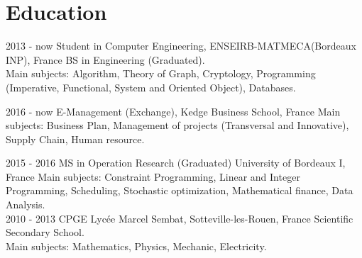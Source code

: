 \documentclass[]{friggeri-cv}
\begin{document}
\section{Education}
\begin{entrylist}
  \entry
    {2013 - now}
    {Student in Computer Engineering,}
    {ENSEIRB-MATMECA(Bordeaux INP), France}
    {BS in Engineering (Graduated).\\
    Main subjects: Algorithm, Theory of Graph, Cryptology, Programming (Imperative, Functional, System and Oriented Object), Databases.}
    
    \entry
     {2016 - now}
    {E-Management (Exchange),}
    {Kedge Business School, France}
    {Main subjects: Business Plan, Management of projects (Transversal and Innovative), Supply Chain, Human resource.\\ }
    
  \entry
    {2015 - 2016}
    {MS in Operation Research (Graduated)}
    {University of Bordeaux I, France}
    {Main subjects: Constraint Programming, Linear and Integer Programming, Scheduling, Stochastic optimization,  Mathematical finance, Data Analysis.\\}
  \entry
    {2010 - 2013}
    {CPGE}
    {Lycée Marcel Sembat, Sotteville-les-Rouen, France}
    {Scientific Secondary School.\\
    Main subjects: Mathematics, Physics, Mechanic, Electricity.}
 
\end{entrylist}



% 
\end{document}
